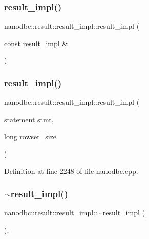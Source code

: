\subsubsection{\texorpdfstring{result\_impl()}{result\_impl()}\hspace{0.1cm}{\footnotesize\ttfamily [1/2]}}
{\footnotesize\ttfamily nanodbc\+::result\+::result\+\_\+impl\+::result\+\_\+impl (\begin{DoxyParamCaption}\item[{const \mbox{\hyperlink{classnanodbc_1_1result_1_1result__impl}{result\+\_\+impl}} \&}]{ }\end{DoxyParamCaption})\hspace{0.3cm}{\ttfamily [delete]}}

\mbox{\label{classnanodbc_1_1result_1_1result__impl_a774aa9e2f965c0031f9191412a367b4f}} 
\subsubsection{\texorpdfstring{result\_impl()}{result\_impl()}\hspace{0.1cm}{\footnotesize\ttfamily [2/2]}}
{\footnotesize\ttfamily nanodbc\+::result\+::result\+\_\+impl\+::result\+\_\+impl (\begin{DoxyParamCaption}\item[{\mbox{\hyperlink{classnanodbc_1_1statement}{statement}}}]{stmt,  }\item[{long}]{rowset\+\_\+size }\end{DoxyParamCaption})\hspace{0.3cm}{\ttfamily [inline]}}



Definition at line 2248 of file nanodbc.\+cpp.

\mbox{\label{classnanodbc_1_1result_1_1result__impl_a20f05a147bbf42d1d3328bd7e0158752}} 
\subsubsection{\texorpdfstring{$\sim$result\_impl()}{~result\_impl()}}
{\footnotesize\ttfamily nanodbc\+::result\+::result\+\_\+impl\+::$\sim$result\+\_\+impl (\begin{DoxyParamCaption}{ }\end{DoxyParamCaption})\hspace{0.3cm}{\ttfamily [inline]}, {\ttfamily [noexcept]}}



